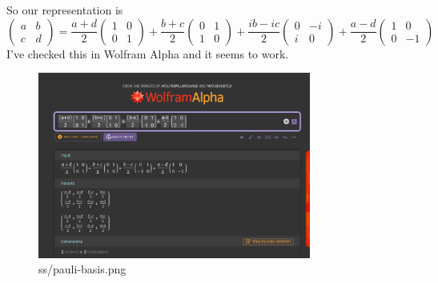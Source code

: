 \documentclass[letter]{article}
\begin{document}
So our representation is 
\[
	\begin{pmatrix} a & b \\ c & d \end{pmatrix}  = 
	\frac{a+d}{2}
	\begin{pmatrix} 1 &0 \\ 0 & 1\end{pmatrix}  + 
	\frac{b+c}{2} 
	\begin{pmatrix} 0 & 1 \\ 1 & 0 \end{pmatrix} +
	\frac{ib - ic}{2} 
	\begin{pmatrix} 0 & -i \\ i & 0 \end{pmatrix}  + 
	\frac{a-d}{2}
	\begin{pmatrix} 1 & 0 \\ 0 & -1 \end{pmatrix} 
\] 
I've checked this in Wolfram Alpha and it seems to work. 
\begin{figure}[htpb]
	\centering
	\includegraphics[width=0.8\textwidth]{ss/pauli-basis.png}
	\caption{ss/pauli-basis.png}
	\label{fig:ss-pauli-basis-png}
\end{figure}
\end{document}
